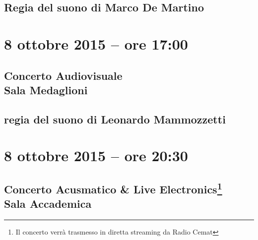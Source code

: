 \documentclass[8pt, twoside, a5paper]{extreport}
\begin{document}
{\fontsize{30}{30} }

\subsection*{\textsf{Regia del suono di Marco De Martino}}

\bigskip

\begin{multicols}{2}

%


\end{multicols}

\clearpage


\section*{8 ottobre 2015 -- ore 17:00}

\subsection*{{\small Concerto Audiovisuale} \\
	\textsf{Sala Medaglioni}}

{\fontsize{30}{30} }

\subsection*{\textsf{regia del suono di Leonardo Mammozzetti}}

\bigskip

\begin{multicols}{2}

%


\end{multicols}

\clearpage

\section*{8 ottobre 2015 -- ore 20:30}

\subsection*{{\small Concerto Acusmatico \& Live Electronics\footnote{ Il concerto verrà trasmesso in diretta streaming da Radio Cemat}} \\
	\textsf{Sala Accademica}}
\end{document}
